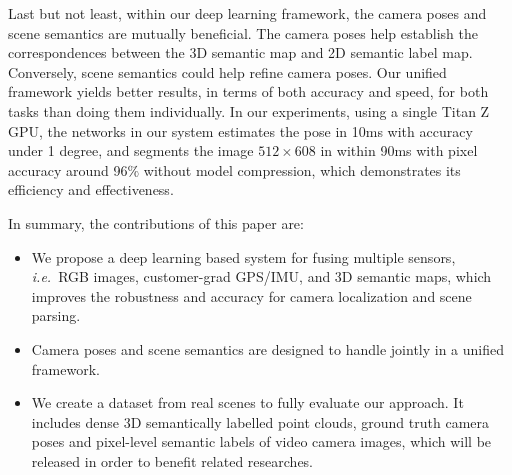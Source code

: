 \documentclass[10pt,twocolumn,letterpaper]{article}
\def\ie{\emph{i.e.}}
\begin{document}
Last but not least, within our deep learning framework, the camera poses and scene semantics are mutually beneficial. The camera poses help establish the correspondences between the 3D semantic map and 2D semantic label map. Conversely, scene semantics could help refine camera poses. Our unified framework yields better results, in terms of both accuracy and speed, for both tasks than doing them individually. In our experiments, using a single Titan Z GPU, the networks in our system estimates the pose in 10ms with accuracy under 1 degree, and segments the image $512 \times 608$ in within 90ms with pixel accuracy around 96$\%$ without model compression, which demonstrates its efficiency and effectiveness.

In summary, the contributions of this paper are:
\begin{itemize}
\vspace{-0.5\baselineskip}
    \setlength{\itemsep}{-2pt}
    \item We propose a deep learning based system for fusing multiple sensors, \ie~RGB images, customer-grad GPS/IMU, and 3D semantic maps, which improves the robustness and accuracy for camera localization and scene parsing.
    \item Camera poses and scene semantics are designed to handle jointly in a unified framework.
    \item We create a dataset from real scenes to fully evaluate our approach. It includes dense 3D semantically labelled point clouds, ground truth camera poses and pixel-level semantic labels of video camera images, which will be released in order to benefit related researches.
\vspace{-0.4\baselineskip}
\end{itemize}
\end{document}
